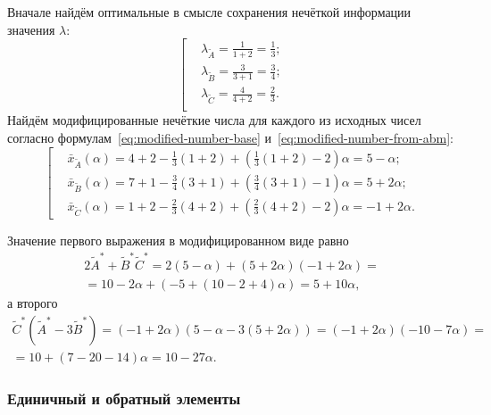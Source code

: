 Вначале найдём оптимальные в смысле сохранения нечёткой информации значения $\lambda$:
\begin{equation*}
  \left[ \begin{aligned}
    & \lambda_{\tilde A}=\frac{1}{1+2}=\frac{1}{3}; \\ 
    & \lambda_{\tilde B}=\frac{3}{3+1}=\frac{3}{4}; \\ 
    & \lambda_{\tilde C}=\frac{4}{4+2}=\frac{2}{3}. \\ 
  \end{aligned} \right.
\end{equation*}
Найдём модифицированные нечёткие числа для каждого из исходных чисел согласно формулам~\eqref{eq:modified-number-base} и~\eqref{eq:modified-number-from-abm}:
\begin{equation*}
  \left[ \begin{aligned}
    & \bar{x}_{\tilde A}\left( \alpha  \right)=4+2-\frac{1}{3}\left( 1+2 \right)+\left( \frac{1}{3}\left( 1+2 \right)-2 \right)\alpha =5-\alpha;  \\ 
    & \bar{x}_{\tilde B}\left( \alpha  \right)=7+1-\frac{3}{4}\left( 3+1 \right)+\left( \frac{3}{4}\left( 3+1 \right)-1 \right)\alpha =5+2\alpha;  \\ 
    & \bar{x}_{\tilde C}\left( \alpha  \right)=1+2-\frac{2}{3}\left( 4+2 \right)+\left( \frac{2}{3}\left( 4+2 \right)-2 \right)\alpha =-1+2\alpha.
\end{aligned} \right. 
\end{equation*}

Значение первого выражения в модифицированном виде равно
\begin{gather*}
  2\tilde A^{*}+\tilde B^{*}\tilde C^{*}=2\left( 5-\alpha  \right)+\left( 5+2\alpha  \right)\left( -1+2\alpha \right)={} \\ 
  {}=10-2\alpha +\left( -5+\left( 10-2+4 \right)\alpha  \right)=5+10\alpha,
\end{gather*}
а второго
\begin{gather*}
  \tilde C^{*}\left(\tilde A^{*}-3\tilde B^{*} \right)=\left(-1+2\alpha  \right)\left( 5-\alpha -3\left( 5+2\alpha  \right) \right)=\left( -1+2\alpha  \right)\left( -10-7\alpha  \right)={} \\ 
  {}=10+\left( 7-20-14 \right)\alpha =10-27\alpha.
\end{gather*}

\subsubsection*{Единичный и обратный элементы}


